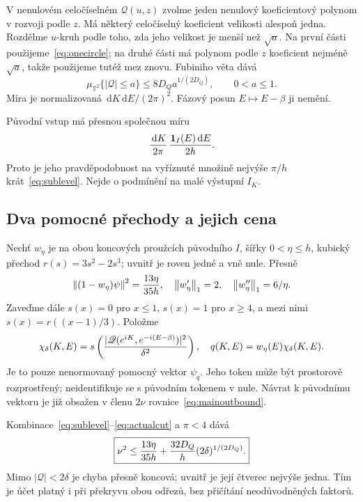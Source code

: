 \documentclass[11pt,a4paper]{article}
\newcommand{\norm}[1]{\left\lVert#1\right\rVert}
\newcommand{\ind}{\mathbf1}
\newcommand{\dd}{\,\mathrm d}
\theoremstyle{remark}\newtheorem{remark}[theorem]{Poznámka}
\numberwithin{equation}{section}
\begin{document}
V nenulovém celočíselném \(\mathscr Q(u,z)\) zvolme jeden nenulový koeficientový polynom v rozvoji podle \(z\). Má některý celočíselný koeficient velikosti alespoň jedna. Rozdělme \(u\)-kruh podle toho, zda jeho velikost je menší než \(\sqrt a\). Na první části použijeme~\eqref{eq:onecircle}; na druhé části má polynom podle \(z\) koeficient nejméně \(\sqrt a\), takže použijeme tutéž mez znovu. Fubiniho věta dává
\begin{equation}
\mu_{\mathbb T^2}\{|\mathscr Q|\le a\}
\le8D_Qa^{1/(2D_Q)},\qquad0<a\le1.
\label{eq:sublevel}
\end{equation}
Míra je normalizovaná \(\dd K\dd E/(2\pi)^2\). Fázový posun \(E\mapsto E-\beta\) ji nemění.

Původní vstup má přesnou společnou míru
\begin{equation}
{\dd K\over2\pi}\,{\ind_I(E)\dd E\over2h}.
\label{eq:flatjoint}
\end{equation}
Proto je jeho pravděpodobnost na vyříznuté množině nejvýše \(\pi/h\) krát~\eqref{eq:sublevel}. Nejde o podmínění na malé výstupní \(I_K\).

\subsection{Dva pomocné přechody a jejich cena}

Nechť \(w_\eta\) je na obou koncových proužcích původního \(I\), šířky \(0<\eta\le h\), kubický přechod \(r(s)=3s^2-2s^3\); uvnitř je roven jedné a vně nule. Přesně
\[
\norm{(1-w_\eta)\psi}^2={13\eta\over35h},\quad
\norm{w_\eta'}_1=2,\quad
\norm{w_\eta''}_1=6/\eta.
\]
Zaveďme dále \(s(x)=0\) pro \(x\le1\), \(s(x)=1\) pro \(x\ge4\), a mezi nimi \(s(x)=r((x-1)/3)\). Položme
\begin{equation}
\chi_\delta(K,E)=s\left({|\mathscr Q(e^{iK},e^{-i(E-\beta)})|^2\over\delta^2}\right),
\quad q(K,E)=w_\eta(E)\chi_\delta(K,E).
\label{eq:actualcut}
\end{equation}
Je to pouze nenormovaný pomocný vektor \(\psi_q\). Jeho token může být prostorově rozprostřený; neidentifikuje se s původním tokenem v nule. Návrat k původnímu vektoru je již obsažen v členu \(2\nu\) rovnice~\eqref{eq:mainoutbound}.

Kombinace~\eqref{eq:sublevel}--\eqref{eq:actualcut} a \(\pi<4\) dává
\begin{equation}
\boxed{\nu^2\le{13\eta\over35h}
 +{32D_Q\over h}(2\delta)^{1/(2D_Q)}.}
\label{eq:nubound}
\end{equation}
Mimo \(|\mathscr Q|<2\delta\) je chyba přesně koncová; uvnitř je její čtverec nejvýše jedna. Tím je účet platný i při překryvu obou odřezů, bez přičítání neodůvodněných faktorů.
\end{document}
